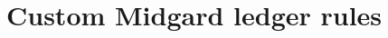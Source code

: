 \documentclass[../midgard.tex]{subfiles}
\begin{document}
\section{Custom Midgard ledger rules}
\label{h:custom-midgard-ledger-rules}
\end{document}
